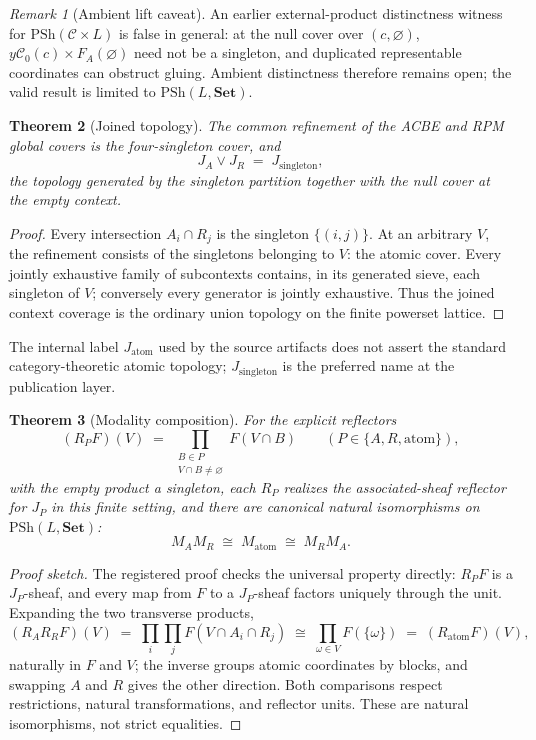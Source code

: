 \documentclass[11pt]{amsart}
\newtheorem{theorem}{Theorem}[section]
\theoremstyle{definition}
\theoremstyle{remark}
\newtheorem{remark}[theorem]{Remark}
\newcommand{\PSh}{\mathrm{PSh}}
\newcommand{\Set}{\mathbf{Set}}
\begin{document}
\begin{remark}[Ambient lift caveat]
An earlier external-product distinctness witness for $\PSh(\mathcal{C}\times L)$ is false in general: at the null cover over $(c,\varnothing)$, $y\mathcal{C}_0(c)\times F_A(\varnothing)$ need not be a singleton, and duplicated representable coordinates can obstruct gluing. Ambient distinctness therefore remains open; the valid result is limited to $\PSh(L,\Set)$.
\end{remark}

\begin{theorem}[Joined topology]\label{thm:nt2-4}
The common refinement of the ACBE and RPM global covers is the four-singleton cover, and
\[
J_A \vee J_R \;=\; J_{\mathrm{singleton}},
\]
the topology generated by the singleton partition together with the null cover at the empty context.
\end{theorem}

\begin{proof}
Every intersection $A_i\cap R_j$ is the singleton $\{(i,j)\}$. At an arbitrary $V$, the refinement consists of the singletons belonging to $V$: the atomic cover. Every jointly exhaustive family of subcontexts contains, in its generated sieve, each singleton of $V$; conversely every generator is jointly exhaustive. Thus the joined context coverage is the ordinary union topology on the finite powerset lattice.
\end{proof}

The internal label $J_{\mathrm{atom}}$ used by the source artifacts does not assert the standard category-theoretic atomic topology; $J_{\mathrm{singleton}}$ is the preferred name at the publication layer.

\begin{theorem}[Modality composition]\label{thm:composition}
For the explicit reflectors
\[
(R_P F)(V) \;=\; \prod_{\substack{B \in P \\ V\cap B \neq \varnothing}} F(V\cap B)
\qquad (P \in \{A, R, \mathrm{atom}\}),
\]
with the empty product a singleton, each $R_P$ realizes the associated-sheaf reflector for $J_P$ in this finite setting, and there are canonical natural isomorphisms on $\PSh(L,\Set)$:
\[
M_A M_R \;\cong\; M_{\mathrm{atom}} \;\cong\; M_R M_A .
\]
\end{theorem}

\begin{proof}[Proof sketch]
The registered proof checks the universal property directly: $R_P F$ is a $J_P$-sheaf, and every map from $F$ to a $J_P$-sheaf factors uniquely through the unit. Expanding the two transverse products,
\[
(R_A R_R F)(V) \;=\; \prod_i \prod_j F(V\cap A_i\cap R_j) \;\cong\; \prod_{\omega\in V} F(\{\omega\}) \;=\; (R_{\mathrm{atom}}F)(V),
\]
naturally in $F$ and $V$; the inverse groups atomic coordinates by blocks, and swapping $A$ and $R$ gives the other direction. Both comparisons respect restrictions, natural transformations, and reflector units. These are natural isomorphisms, not strict equalities.
\end{proof}
\end{document}
